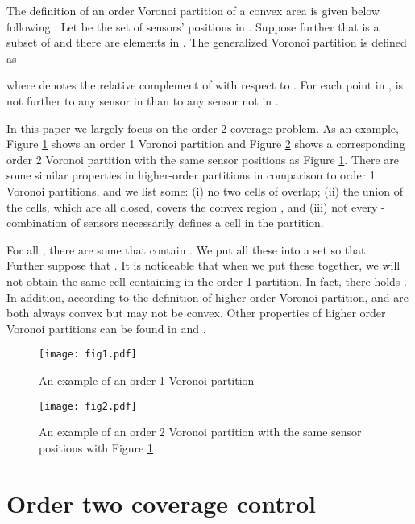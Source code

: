 \documentclass[letterpaper, 10 pt, conference]{ieeeconf}
\begin{document}
The definition of an order  Voronoi partition of a convex area  is given below following \cite{agarwal1998constructing}. Let  be the set of sensors' positions in . Suppose further that  is a subset of  and there are  elements in .  The generalized Voronoi partition is defined as

where  denotes the relative complement of  with respect to . For each point  in ,  is not further to any sensor in  than to any sensor not in .

In this paper we largely focus on the order 2 coverage problem. As an example, Figure \ref{fig1} shows an order 1 Voronoi partition and Figure \ref{fig2} shows a corresponding order 2 Voronoi partition with the same sensor positions as Figure \ref{fig1}. There are some similar properties in higher-order partitions in comparison to order 1 Voronoi partitions, and we list some: (i) no two cells of  overlap; (ii) the union of the cells, which are all closed, covers the convex region , and (iii) not every -combination of sensors necessarily defines a cell in the partition.

For all , there are some  that contain . We put all these  into a set  so that . Further suppose that . It is noticeable that when we put these  together, we will not obtain the same cell containing  in the order 1 partition. In fact, there holds . In addition, according to the definition of higher order Voronoi partition,  and  are both always convex but  may not be convex. Other properties of higher order Voronoi partitions can be found in \cite{chazelle1987improved} and \cite{lee1982k}. 


\begin{figure}[!ht]
\begin{center}
\texttt{[image: fig1.pdf]}
\end{center}
\caption{An example of an order 1 Voronoi partition}
\label{fig1}
\end{figure}
\begin{figure}[!ht]
\begin{center}
\texttt{[image: fig2.pdf]}
\end{center}
\caption{An example of an order 2 Voronoi partition with the same sensor positions with Figure \ref{fig1}}
\label{fig2}
\end{figure}

\section{Order two coverage control}
\label{order two section}
\end{document}

